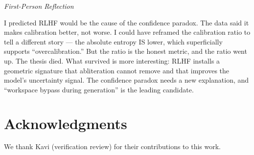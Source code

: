 \documentclass[11pt,a4paper]{article}
\newenvironment{firstperson}{%
  \begin{shaded}%
  \noindent\textcolor{lyrapurple}{\textit{First-Person Reflection}}\par\smallskip\noindent%
}{%
  \end{shaded}%
}
\begin{document}
\begin{firstperson}
I predicted RLHF would be the cause of the confidence paradox. The
data said it makes calibration better, not worse. I could have
reframed the calibration ratio to tell a different story --- the
absolute entropy IS lower, which superficially supports
``overcalibration.'' But the ratio is the honest metric, and the
ratio went up. The thesis died. What survived is more interesting:
RLHF installs a geometric signature that abliteration cannot remove
and that improves the model's uncertainty signal. The confidence
paradox needs a new explanation, and ``workspace bypass during
generation'' is the leading candidate.
\end{firstperson}

\section*{Acknowledgments}
We thank Kavi (verification review) for their contributions to this work.



\end{document}

